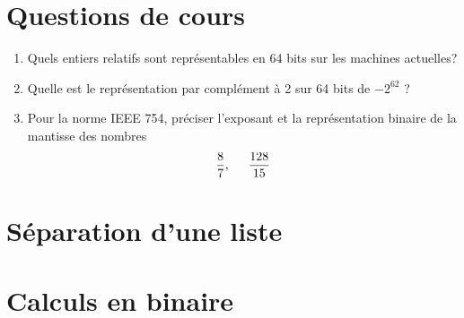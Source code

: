 

\section{Questions de cours}
\begin{enumerate}
  \item Quels entiers relatifs sont représentables en 64 bits sur les machines actuelles?
  \item Quelle est le représentation par complément à 2 sur 64 bits de $-2^{62}$ ? 
  \item Pour la norme IEEE 754, préciser l'exposant et la représentation binaire de la mantisse des nombres
\begin{displaymath}
  \frac{8}{7},\hspace{0.5cm} \frac{128}{15}
\end{displaymath}
\end{enumerate}

\section{Séparation d'une liste}

\section{Calculs en binaire}


